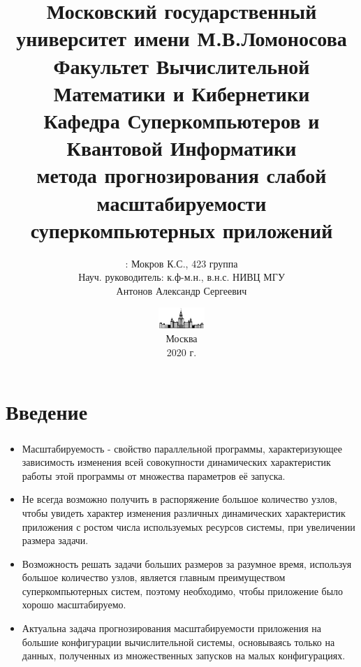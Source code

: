 \documentclass[unicode, t, 11pt]{beamer}%
\title{
	{\footnotesize\color{black}Московский государственный университет имени М.В.Ломоносова\\
    Факультет Вычислительной Математики и Кибернетики\\
    Кафедра Суперкомпьютеров и Квантовой Информатики\\}
    \vspace{\baselineskip}
    {\LARGEРазработка метода прогнозирования слабой масштабируемости суперкомпьютерных приложений}
}
\author{\footnotesizeСтудент: Мокров К.С., 423 группа\\
		Науч. руководитель: к.ф-м.н.,
		в.н.с. НИВЦ МГУ\\
		Антонов Александр Сергеевич}
\date{\includegraphics[height=0.8cm]{./images/MSU}\\
	  \scriptsize
	  Москва\\
	  2020 г.}
\begin{document}
	\frame[plain]{\titlepage}	%
	\section{Введение}
		\begin{frame}
		\footnotesize
		\frametitle{\insertsection}
		\begin{itemize}[label = \(\bullet\)]
		\item Масштабируемость - свойство параллельной программы, характеризующее зависимость изменения всей совокупности динамических характеристик работы этой программы от множества параметров её запуска.
		\item Не всегда возможно получить в распоряжение большое количество узлов, чтобы увидеть характер изменения различных динамических характеристик приложения с ростом числа используемых ресурсов системы, при увеличении размера задачи.
		\item Возможность решать задачи больших размеров за разумное время, используя большое количество узлов, является главным преимуществом суперкомпьютерных систем, поэтому необходимо, чтобы приложение было хорошо масштабируемо.
		\item Актуальна задача прогнозирования масштабируемости приложения на большие конфигурации вычислительной системы, основываясь только на данных, полученных из множественных запусков на малых конфигурациях.

		\end{itemize}
		\end{frame}
\end{document}
